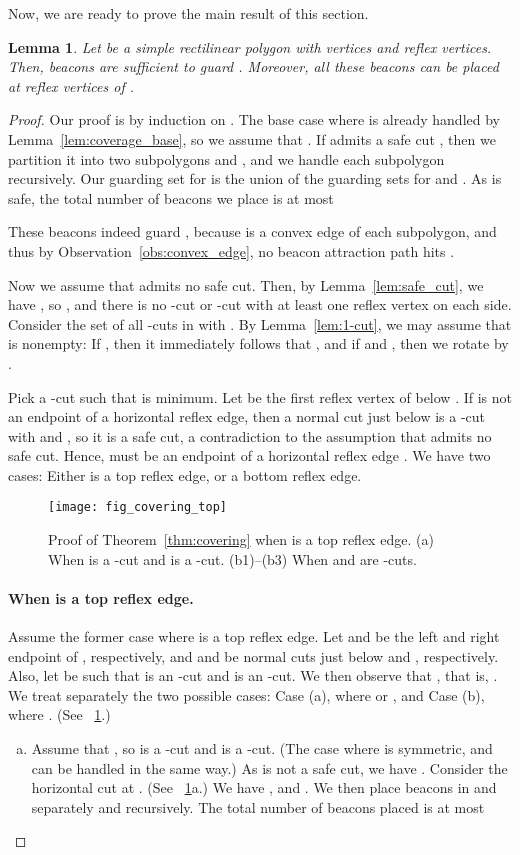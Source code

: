 \documentclass[11pt]{article}
\newtheorem{lemma}{Lemma}
\theoremstyle{definition}
\begin{document}
Now, we are ready to prove the main result of this section.
\begin{lemma} \label{lem:covering}
 Let  be a simple rectilinear polygon  with  vertices and
  reflex vertices.
 Then,  beacons are sufficient
 to guard .  Moreover, all these beacons can be placed at reflex vertices of .
\end{lemma}
\begin{proof}
Our proof is by induction on .
The base case where  is already handled by Lemma~\ref{lem:coverage_base},
so  we assume that .
If  admits a safe cut , then we partition it into two subpolygons  and ,
and  we handle each subpolygon recursively. 
Our guarding set for  is the union of the guarding sets
for  and . As  is safe, the total number of beacons we place is at most
 
These beacons indeed guard , because
 is a convex edge of each subpolygon,
and thus by Observation~\ref{obs:convex_edge}, no beacon attraction path hits .

Now we assume that  admits no safe cut.
Then, by Lemma~\ref{lem:safe_cut}, we have , so ,
and there is no -cut or -cut with at least one reflex vertex on each side.
Consider the set  of all -cuts  in  with .
By Lemma~\ref{lem:1-cut}, we may assume that  is nonempty:
If , then it immediately follows that , 
and  if  and ,
then we rotate  by .

Pick a -cut  such that  is minimum.
Let  be the first reflex vertex of  below .
If  is not an endpoint of a horizontal reflex edge, then a normal cut  just below 
is a -cut with  and ,
so it is a safe cut, a contradiction to the assumption that  admits no safe cut.
Hence,  must be an endpoint of a horizontal reflex edge .
We have two cases: Either  is a top reflex edge, or a bottom reflex edge.

\begin{figure}[tb]
\centering
\texttt{[image: fig\_covering\_top]}
\caption{Proof of Theorem~\ref{thm:covering} when  is a top reflex edge.
(a) When  is a -cut and  is a -cut.
(b1)--(b3) When  and  are -cuts.}
\label{fig:covering_top}
\end{figure}


\paragraph{When  is a top reflex edge.}
Assume the former case where  is a top reflex edge.
Let  and  be the left and right endpoint of , respectively, and
 and  be normal cuts just below  and ,
respectively.
Also, let  be such that
 is an -cut and  is an -cut.
We then observe that , that is, .
We treat separately the two possible cases: 
Case (a), where  or , and Case (b), where .
(See \figurename~\ref{fig:covering_top}.)
\begin{enumerate}[(a)] \item Assume that , so  is a -cut and  is a -cut.
 (The case where  is symmetric, and can be handled in the same way.)
 As  is not a safe cut, we have .
 Consider the horizontal cut  at .
 (See \figurename~\ref{fig:covering_top}a.)
We have , and .
 We then place beacons in  and  separately and recursively.
 The total number of beacons placed is at most
 


\end{enumerate}
\end{proof}
\end{document}
